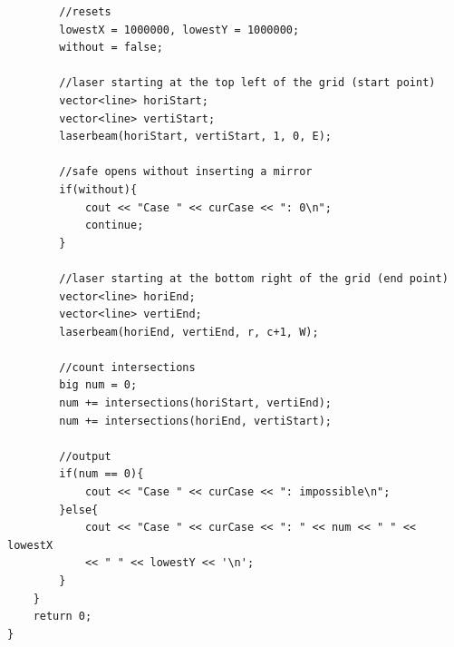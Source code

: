 \begin{verbatim}
        //resets
        lowestX = 1000000, lowestY = 1000000;
        without = false;

        //laser starting at the top left of the grid (start point)
        vector<line> horiStart;
        vector<line> vertiStart;
        laserbeam(horiStart, vertiStart, 1, 0, E);

        //safe opens without inserting a mirror
        if(without){
            cout << "Case " << curCase << ": 0\n";
            continue;
        }

        //laser starting at the bottom right of the grid (end point)
        vector<line> horiEnd;
        vector<line> vertiEnd;
        laserbeam(horiEnd, vertiEnd, r, c+1, W);

        //count intersections
        big num = 0;
        num += intersections(horiStart, vertiEnd);
        num += intersections(horiEnd, vertiStart);

        //output
        if(num == 0){
            cout << "Case " << curCase << ": impossible\n";
        }else{
            cout << "Case " << curCase << ": " << num << " " << lowestX 
            << " " << lowestY << '\n';
        }
    }
    return 0;
}    
\end{verbatim}
%
